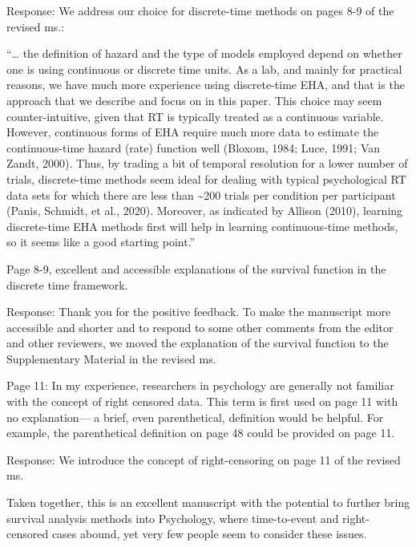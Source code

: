 \documentclass[
]{article}
\renewenvironment{quote}{\begin{leftbar}}{\end{leftbar}}
\begin{document}
Response: We address our choice for discrete-time methods on pages 8-9
of the revised ms.:

``\ldots{} the definition of hazard and the type of models employed
depend on whether one is using continuous or discrete time units. As a
lab, and mainly for practical reasons, we have much more experience
using discrete-time EHA, and that is the approach that we describe and
focus on in this paper. This choice may seem counter-intuitive, given
that RT is typically treated as a continuous variable. However,
continuous forms of EHA require much more data to estimate the
continuous-time hazard (rate) function well (Bloxom, 1984; Luce, 1991;
Van Zandt, 2000). Thus, by trading a bit of temporal resolution for a
lower number of trials, discrete-time methods seem ideal for dealing
with typical psychological RT data sets for which there are less than
\textasciitilde200 trials per condition per participant (Panis, Schmidt,
et al., 2020). Moreover, as indicated by Allison (2010), learning
discrete-time EHA methods first will help in learning continuous-time
methods, so it seems like a good starting point.''

\begin{quote}
Page 8-9, excellent and accessible explanations of the survival function
in the discrete time framework.
\end{quote}

Response: Thank you for the positive feedback. To make the manuscript
more accessible and shorter and to respond to some other comments from
the editor and other reviewers, we moved the explanation of the survival
function to the Supplementary Material in the revised ms.

\begin{quote}
Page 11: In my experience, researchers in psychology are generally not
familiar with the concept of right censored data. This term is first
used on page 11 with no explanation--- a brief, even parenthetical,
definition would be helpful. For example, the parenthetical definition
on page 48 could be provided on page 11.
\end{quote}

Response: We introduce the concept of right-censoring on page 11 of the
revised ms.

\begin{quote}
Taken together, this is an excellent manuscript with the potential to
further bring survival analysis methods into Psychology, where
time-to-event and right-censored cases abound, yet very few people seem
to consider these issues.
\end{quote}
\end{document}
